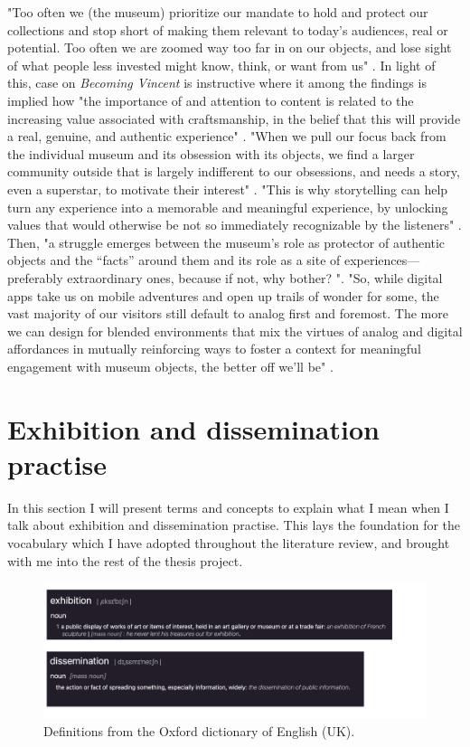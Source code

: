  "Too often we (the museum) prioritize our mandate to hold and protect our collections and stop short of making them relevant to today’s audiences, real or potential. Too often we are zoomed way too far in on our objects, and lose sight of what people less invested might know, think, or want from us" \autocite[p. 1]{vermeeren_museum_2018}. In light of this, \autocite{vermeeren_vincent_2018} case on \emph{Becoming Vincent} is instructive where it among the findings is implied how "the importance of and attention to content is related to the increasing value associated with craftsmanship, in the belief that this will provide a real, genuine, and authentic experience" \autocite[p. 298]{vermeeren_vincent_2018}. "When we pull our focus back from the individual museum and its obsession with its objects, we find a larger community outside that is largely indifferent to our obsessions, and needs a story, even a superstar, to motivate their interest" \autocite[p. 1]{vermeeren_museum_2018}. "This is why storytelling can help turn any experience into a memorable and meaningful experience, by unlocking values that would otherwise be not so immediately recognizable by the listeners" \autocite[p. 299]{vermeeren_vincent_2018}.
 Then, "a struggle emerges between the museum’s role as protector of authentic objects and the “facts” around them and its role as a site of experiences—preferably extraordinary ones, because if not, why bother? "\autocite[p. 1]{vermeeren_museum_2018}. "So, while digital apps take us on mobile adventures and open up trails of wonder for some, the vast majority of our visitors still default to analog first and foremost. The more we can design for blended environments that mix the virtues of analog and digital affordances in mutually reinforcing ways to foster a context for meaningful engagement with museum objects, the better off we’ll be" \autocite[p. 1]{vermeeren_museum_2018}.


\section{Exhibition and dissemination practise}
In this section I will present terms and concepts to explain what I mean when I talk about exhibition and dissemination practise. This lays the foundation for the vocabulary which I have adopted throughout the literature review, and brought with me into the rest of the thesis project. 

\begin{figure}[H]
\includegraphics[width=14cm]{pictures/background/exh_diss.png}
\caption{Definitions from the Oxford dictionary of English (UK).}
\centering
\end{figure}

